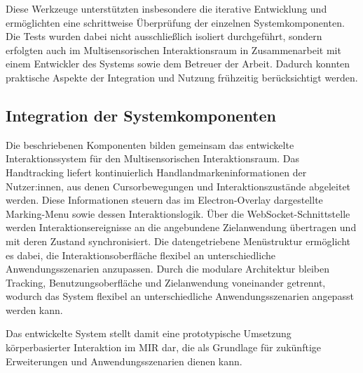 Diese Werkzeuge unterstützten insbesondere die iterative Entwicklung und ermöglichten eine schrittweise Überprüfung der einzelnen Systemkomponenten. Die Tests wurden dabei nicht ausschließlich isoliert durchgeführt, sondern erfolgten auch im Multisensorischen Interaktionsraum in Zusammenarbeit mit einem Entwickler des Systems sowie dem Betreuer der Arbeit. Dadurch konnten praktische Aspekte der Integration und Nutzung frühzeitig berücksichtigt werden.


\subsection{Integration der Systemkomponenten}
Die beschriebenen Komponenten bilden gemeinsam das entwickelte Interaktionssystem für den Multisensorischen Interaktionsraum. 
Das Handtracking liefert kontinuierlich Handlandmarkeninformationen der Nutzer:innen, aus denen Cursorbewegungen und Interaktions\-zustände abgeleitet werden.
Diese Informationen steuern das im Electron-Overlay dargestellte Marking-Menu sowie dessen Interaktionslogik.
Über die WebSocket-Schnittstelle werden Interaktionsereignisse an die angebundene Zielanwendung übertragen und mit deren Zustand synchronisiert. 
Die datengetriebene Menüstruktur ermöglicht es dabei, die Interaktionsoberfläche flexibel an unterschiedliche Anwendungsszenarien anzupassen.
Durch die modulare Architektur bleiben Tracking, Benutzungsoberfläche und Zielanwendung voneinander getrennt, wodurch das System flexibel an unterschiedliche Anwendungsszenarien angepasst werden kann.

Das entwickelte System stellt damit eine prototypische Umsetzung körper\-basierter Interaktion im MIR dar, die als Grundlage für zukünftige Erweiterungen und Anwendungsszenarien dienen kann.